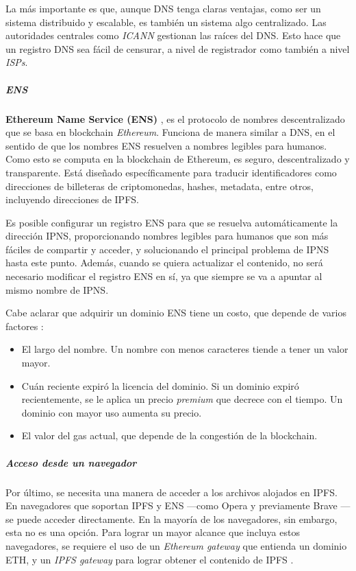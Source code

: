 La más importante es que, aunque DNS tenga claras ventajas, como ser un sistema distribuido y escalable, es también un sistema algo centralizado. Las autoridades centrales como \textit{ICANN} gestionan las raíces del DNS. Esto hace que un registro DNS sea fácil de censurar, a nivel de registrador como también a nivel \textit{ISPs}.

\subparagraph{ENS}

\textbf{Ethereum Name Service (ENS)} \cite{ens}, es el protocolo de nombres descentralizado que se basa en blockchain \textit{Ethereum}. Funciona de manera similar a DNS, en el sentido de que los nombres ENS resuelven a nombres legibles para humanos. Como esto se computa en la blockchain de Ethereum, es seguro, descentralizado y transparente. Está diseñado específicamente para traducir identificadores como direcciones de billeteras de criptomonedas, hashes, metadata, entre otros, incluyendo direcciones de IPFS.

Es posible configurar un registro ENS para que se resuelva automáticamente la dirección IPNS, proporcionando nombres legibles para humanos que son más fáciles de compartir y acceder, y solucionando el principal problema de IPNS hasta este punto. Además, cuando se quiera actualizar el contenido, no será necesario modificar el registro ENS en sí, ya que siempre se va a apuntar al mismo nombre de IPNS.

Cabe aclarar que adquirir un dominio ENS tiene un costo, que depende de varios factores \cite{ens-price}:
\begin{itemize}
    \item El largo del nombre. Un nombre con menos caracteres tiende a tener un valor mayor.
    \item Cuán reciente expiró la licencia del dominio. Si un dominio expiró recientemente, se le aplica un precio \textit{premium} que decrece con el tiempo. Un dominio con mayor uso aumenta su precio.
    \item El valor del gas actual, que depende de la congestión de la blockchain.
\end{itemize}

\subparagraph{Acceso desde un navegador}

Por último, se necesita una manera de acceder a los archivos alojados en IPFS. En navegadores que soportan IPFS y ENS —como Opera \cite{opera-ipfs} y previamente Brave \cite{brave-ipfs}— se puede acceder directamente. En la mayoría de los navegadores, sin embargo, esta no es una opción. Para lograr un mayor alcance que incluya estos navegadores, se requiere el uso de un \textit{Ethereum gateway} que entienda un dominio ETH, y un \textit{IPFS gateway} para lograr obtener el contenido de IPFS \cite{ipfs-gateway}.


